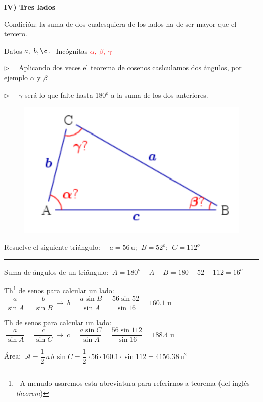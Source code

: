 \vspace{0.4cm}

\begin{multicols}{2}
\textbf{IV) Tres lados}

Condición: la suma de dos cualesquiera de los lados ha de ser mayor que el tercero.

Datos \textcolor{blue}{$ a,\ b,\c \, . \ $} Incógnitas \textcolor{red}{$ \alpha,\ \beta,\ \gamma $}

$\triangleright \quad $ Aplicando dos veces el teorema de cosenos caslculamos dos ángulos, por ejemplo $\alpha \text{ y } \beta$

$\triangleright \quad $ $\gamma$ será lo que falte hasta 180$^o$ a la suma de los dos anteriores.

\begin{figure}[H]
	\centering
	\includegraphics[width=.45\textwidth]{img-triang/RTC4.png}
\end{figure}
\end{multicols}


\vspace{5mm}


\begin{miejercicio}

Resuelve el siguiente triángulo: $\quad a=56 \, \mathrm{u};\ \ B=52^o;\ \ C=112^o$

\rule{250pt}{0.1pt}

\vspace{2mm} Suma de ángulos de un triángulo: $\ A=180^o-A-B=180-52-112=16^o$

\vspace{2mm} Th\footnote{ $\ $ A menudo usaremos esta abreviatura para referirnos a teorema (del inglés \emph{theorem})} de senos para calcular un lado: $\ \dfrac{a}{\sin A}=\dfrac{b}{\sin B} \ \to \ b= \dfrac{a\sin B}{\sin A} = \dfrac{56 \sin 52}{\sin 16}=160.1\, \, \mathrm{u}$

\vspace{2mm} Th de senos para calcular un lado: $\ \dfrac{a}{\sin A}=\dfrac{c}{\sin C} \ \to \ c= \dfrac{a\sin C}{\sin A} = \dfrac{56 \sin 112}{\sin 16}=188.4\, \, \mathrm{u}$

\vspace{2mm} Área: $\ \mathcal A=\dfrac 1 2 \, a\, b \, \sin C = \dfrac 1 2 \cdot 56\cdot 160.1 \cdot \sin 112 = 4156.38 \, \mathrm{u}^2$
	
\end{miejercicio}


